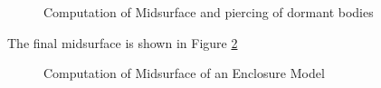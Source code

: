 \begin{figure}[!h]
\caption{Computation of Midsurface and piercing of dormant bodies}
\label{fig:results:dormantenclosure}
\end{figure}

The final midsurface is shown in Figure \ref{fig:results:outputmidsurfenclosure}

\begin{figure}[!htb]
\centering     %
{} \qquad
{}
\caption{Computation of Midsurface of an Enclosure Model}
\label{fig:results:outputmidsurfenclosure}
\end{figure}

